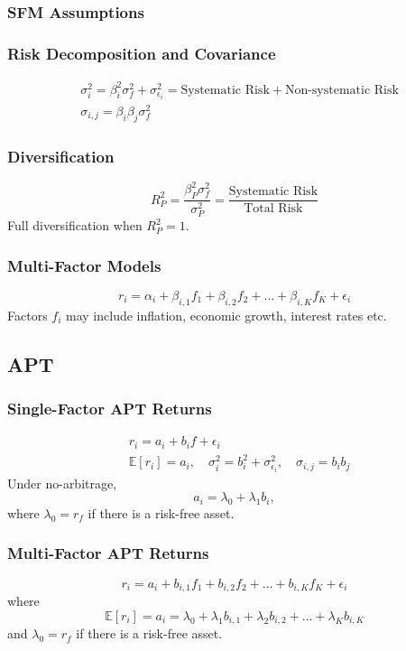 \documentclass[11pt]{article}
\newcommand{\E}{\mathbb{E}}
\begin{document}
	\subsubsection{SFM Assumptions}
	\subsubsection{Risk Decomposition and Covariance}
	\begin{align*}
	& \sigma_i^2 = \beta_i^2 \sigma_f^2 + \sigma_{\epsilon_{i}}^2 = \text{Systematic Risk} + \text{Non-systematic Risk}\\
	& \sigma_{i, j} = \beta_i \beta_j \sigma_f^2
	\end{align*}
	\subsubsection{Diversification}	
	\[	R_P^2 = \frac{\beta_P^2 \sigma_f^2}{\sigma_P^2} = \frac{\text{Systematic Risk}}{\text{Total Risk}}\]
	Full diversification when \( R_P^2 = 1 \).
	\subsubsection{Multi-Factor Models}
	\[	r_i = \alpha_i + \beta_{i, 1}f_1 + \beta_{i, 2}f_2 + ... + \beta_{i, K} f_K + \epsilon_i \]
	Factors \( f_i \) may include inflation, economic growth, interest rates etc.
	\subsection{APT}
	\subsubsection{Single-Factor APT Returns}
	\begin{align*}
		& r_i = a_i + b_i f + \epsilon_i\\[5pt]
		& \E[r_i] = a_i,\quad \sigma_i^2 = b_i^2 + \sigma_{\epsilon_i}^2,\quad\sigma_{i, j} = b_{i}b_{j}
	\end{align*}
	Under no-arbitrage, 
	\[	a_i = \lambda_0 + \lambda_1 b_i,\]
	where \( \lambda_0 = r_f \) if there is a risk-free asset.
	\subsubsection{Multi-Factor APT Returns}
	\[	r_i = a_i + b_{i,1 }f_1 + b_{i,2} f_2 + ... + b_{i, K}f_K + \epsilon_i\]
	where
	\[	\E[r_i] = a_i = \lambda_0 + \lambda_1 b_{i,1} + \lambda_2 b_{i, 2} + ... + \lambda_K b_{i, K}\]
	and \( \lambda_0 = r_f \) if there is a risk-free asset.
	\newpage
\end{document}

